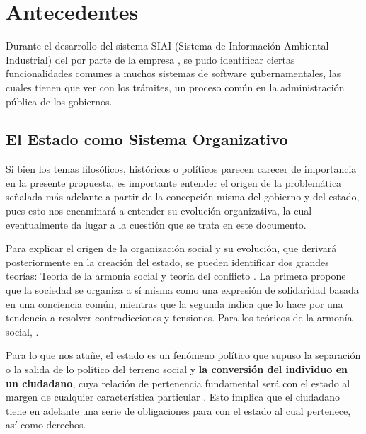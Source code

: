 \section{Antecedentes}

Durante el desarrollo del sistema SIAI (Sistema de Información Ambiental Industrial) del  por parte de la empresa ,
se pudo identificar ciertas funcionalidades comunes a muchos sistemas de software gubernamentales,
las cuales tienen que ver con los trámites, un proceso común en la administración pública de los gobiernos.

\subsection{El Estado como Sistema Organizativo}

Si bien los temas filosóficos, históricos o políticos parecen carecer de importancia en la presente propuesta,
es importante entender el origen de la problemática señalada más adelante a partir de la concepción misma del gobierno y del estado, pues esto nos encaminará a entender su evolución organizativa,
la cual eventualmente da lugar a la cuestión que se trata en este documento.

Para explicar el origen de la organización social y su evolución, que derivará posteriormente en la creación del estado, se pueden identificar dos grandes teorías:
Teoría de la armonía social y teoría del conflicto \cite{vacarofernandezOrigenEstado2000}.
La primera propone que la sociedad se organiza a sí misma como una expresión de solidaridad basada en una conciencia común,
mientras que la segunda indica que lo hace por una tendencia a resolver contradicciones y tensiones.
Para los teóricos de la armonía social, \cite[3]{vacarofernandezOrigenEstado2000}.

Para lo que nos atañe, el estado es un fenómeno político que supuso la separación o la salida de lo político del terreno social y
\textbf{la conversión del individuo en un ciudadano}, cuya relación de pertenencia fundamental será con el estado al margen de cualquier característica particular \cite{gordilloperezPorQueSurge2017}.
Esto implica que el ciudadano tiene en adelante una serie de obligaciones para con el estado al cual pertenece, así como derechos.

